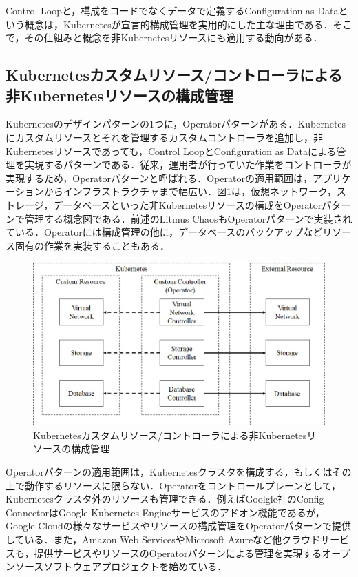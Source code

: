 \documentclass[12pt,a4j]{ujreport}
\begin{document}
Control Loopと，構成をコードでなくデータで定義するConfiguration as Dataという概念は，Kubernetesが宣言的構成管理を実用的にした主な理由である．そこで，その仕組みと概念を非Kubernetesリソースにも適用する動向がある．

\subsection{Kubernetesカスタムリソース/コントローラによる非Kubernetesリソースの構成管理}
Kubernetesのデザインパターンの1つに，Operatorパターン\cite{ref49}がある．Kubernetesにカスタムリソースとそれを管理するカスタムコントローラを追加し，非Kubernetesリソースであっても，Control LoopとConfiguration as Dataによる管理を実現するパターンである．従来，運用者が行っていた作業をコントローラが実現するため，Operatorパターンと呼ばれる．Operatorの適用範囲は，アプリケーションからインフラストラクチャまで幅広い\cite{ref50}．図\ref{fig14}は，仮想ネットワーク，ストレージ，データベースといった非Kubernetesリソースの構成をOperatorパターンで管理する概念図である．前述のLitmus ChaosもOperatorパターンで実装されている．Operatorには構成管理の他に，データベースのバックアップなどリソース固有の作業を実装することもある．

\begin{figure}[tb]
  \centerline{\includegraphics[clip,width=140mm]{images/operator-for-er.jpg}}
  \caption{Kubernetesカスタムリソース/コントローラによる非Kubernetesリソースの構成管理}\label{fig14}
\end{figure}

Operatorパターンの適用範囲は，Kubernetesクラスタを構成する，もしくはその上で動作するリソースに限らない．Operatorをコントロールプレーンとして，Kubernetesクラスタ外のリソースも管理できる．例えばGoolgle社のConfig Connector\cite{ref51}はGoogle Kubernetes Engineサービスのアドオン機能であるが，Google Cloudの様々なサービスやリソースの構成管理をOperatorパターンで提供している．また，Amazon Web ServicesやMicrosoft Azureなど他クラウドサービスも，提供サービスやリソースのOperatorパターンによる管理を実現するオープンソースソフトウェアプロジェクトを始めている\cite{ref52,ref53}．
\end{document}
